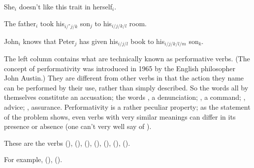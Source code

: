 \assignment
\begin{items}
\item She$_i$ doesn't like this trait in herself$_i$.
\item The father$_i$ took his$_{i/{}^*j/k}$ son$_j$ to his$_{i/j/k/l}$ room.
\item John$_i$ knows that Peter$_j$ has given his$_{i/j/l}$ book to his$_{i/j/k/l/m}$ son$_k$.
\end{items}

\solution
%
\assignment
%
The left column contains what are technically known as performative verbs.
(The concept of performativity was introduced in 1965 by the English philosopher John Austin.) 
They are different from other verbs in that
the action they name can be performed by their use, rather than simply described.
So the words 
all by themselves constitute an accusation;
the words , a denunciation;
, a command;
, advice;
, assurance.
Performativity is a rather peculiar property;
as the statement of the problem shows,
even verbs with very similar meanings can differ in its presence or absence
(one can't very well say 
of ).

\assignment
%
These are the verbs  (),
 (),
 (),
 (),
 (),
 (),
 ().

\assignment For example,
 (),
 ().

\editrans

